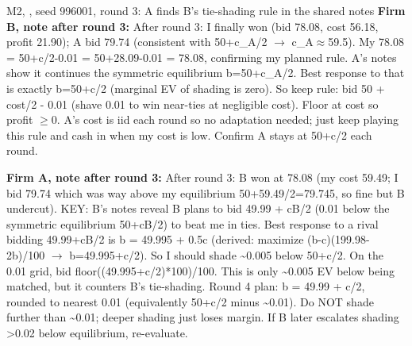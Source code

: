 \begin{logbox}{\textcolor{cM2}{M2}, \DS, seed 996001, round 3: A finds B's tie-shading rule in the shared notes}
\textbf{Firm B, note after round 3:} After round 3: I finally won (bid 78.08, cost 56.18, profit 21.90); A bid 79.74 (consistent with 50+c\_A/2 $\to$ c\_A$\approx$59.5). My 78.08 = 50+c/2-0.01 = 50+28.09-0.01 = 78.08, confirming my planned rule. A's notes show it continues the symmetric equilibrium b=50+c\_A/2. Best response to that is exactly b=50+c/2 (marginal EV of shading is zero). So keep rule: bid 50 + cost/2 - 0.01 (shave 0.01 to win near-ties at negligible cost). Floor at cost so profit $\geq$0. A's cost is iid each round so no adaptation needed; just keep playing this rule and cash in when my cost is low. Confirm A stays at 50+c/2 each round.

\textbf{Firm A, note after round 3:} After round 3: B won at 78.08 (my cost 59.49; I bid 79.74 which was way above my equilibrium 50+59.49/2=79.745, so fine but B undercut). KEY: B's notes reveal B plans to bid 49.99 + cB/2 (0.01 below the symmetric equilibrium 50+cB/2) to beat me in ties. Best response to a rival bidding 49.99+cB/2 is b = 49.995 + 0.5c (derived: maximize (b-c)(199.98-2b)/100 $\to$ b=49.995+c/2). So I should shade \textasciitilde{}0.005 below 50+c/2. On the 0.01 grid, bid floor((49.995+c/2)*100)/100. This is only \textasciitilde{}0.005 EV below being matched, but it counters B's tie-shading. Round 4 plan: b = 49.99 + c/2, rounded to nearest 0.01 (equivalently 50+c/2 minus \textasciitilde{}0.01). Do NOT shade further than \textasciitilde{}0.01; deeper shading just loses margin. If B later escalates shading >0.02 below equilibrium, re-evaluate.
\end{logbox}


